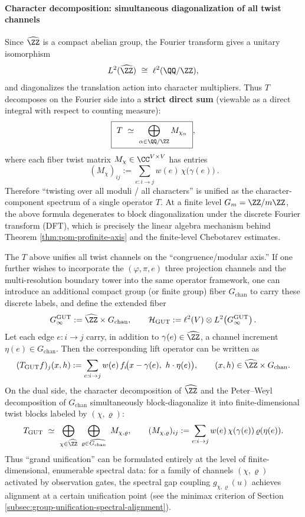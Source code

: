 \paragraph{Character decomposition: simultaneous diagonalization of all twist channels}
Since \(\widehat{\ZZ}\) is a compact abelian group, the Fourier transform gives a unitary isomorphism
\[
L^2(\widehat{\ZZ})\ \cong\ \ell^2(\QQ/\ZZ),
\]
and diagonalizes the translation action into character multipliers. Thus \(T\) decomposes on the Fourier side into a \textbf{strict direct sum} (viewable as a direct integral with respect to counting measure):
\[
\boxed{\ T\ \simeq\ \bigoplus_{\alpha\in\QQ/\ZZ} M_{\chi_\alpha}\ },
\]
where each fiber twist matrix \(M_{\chi}\in\CC^{V\times V}\) has entries
\[
\boxed{\ (M_\chi)_{ij}:=\sum_{e:i\to j} w(e)\,\chi\!\bigl(\gamma(e)\bigr)\ }.
\]
Therefore ``twisting over all moduli / all characters'' is unified as the character-component spectrum of a single operator \(T\).
At a finite level \(G_m=\ZZ/m\ZZ\), the above formula degenerates to block diagonalization under the discrete Fourier transform (DFT), which is precisely the linear algebra mechanism behind Theorem \ref{thm:pom-profinite-axis} and the finite-level Chebotarev estimates.

\begin{remark}\label{rem:pom-grand-unified-lift}
The \(T\) above unifies all twist channels on the ``congruence/modular axis.''
If one further wishes to incorporate the \((\varphi,\pi,e)\) three projection channels and the multi-resolution boundary tower into the same operator framework,
one can introduce an additional compact group (or finite group) fiber \(G_{\mathrm{chan}}\) to carry these discrete labels, and define the extended fiber
\[
G_\infty^{\mathrm{GUT}}
:=\widehat{\ZZ}\times G_{\mathrm{chan}},
\qquad
\mathcal{H}_{\mathrm{GUT}}:=\ell^2(V)\otimes L^2\!\left(G_\infty^{\mathrm{GUT}}\right).
\]
Let each edge \(e:i\to j\) carry, in addition to \(\gamma(e)\in\widehat{\ZZ}\), a channel increment \(\eta(e)\in G_{\mathrm{chan}}\).
Then the corresponding lift operator can be written as
\[
(T_{\mathrm{GUT}}f)_j(x,h)
:=\sum_{e:i\to j} w(e)\,f_i\!\bigl(x-\gamma(e),\ h\cdot \eta(e)\bigr),
\qquad (x,h)\in \widehat{\ZZ}\times G_{\mathrm{chan}}.
\]
On the dual side, the character decomposition of \(\widehat{\ZZ}\) and the Peter--Weyl decomposition of \(G_{\mathrm{chan}}\) simultaneously block-diagonalize it into finite-dimensional twist blocks labeled by \((\chi,\varrho)\):
\[
T_{\mathrm{GUT}}\ \simeq\ \bigoplus_{\chi\in\widehat{\ZZ}}\ \bigoplus_{\varrho\in\widehat{G_{\mathrm{chan}}}}\ M_{\chi,\varrho},
\qquad
(M_{\chi,\varrho})_{ij}:=\sum_{e:i\to j} w(e)\,\chi(\gamma(e))\,\varrho(\eta(e)).
\]
Thus ``grand unification'' can be formulated entirely at the level of finite-dimensional, enumerable spectral data: for a family of channels \((\chi,\varrho)\) activated by observation gates, the spectral gap coupling \(g_{\chi,\varrho}(u)\) achieves alignment at a certain unification point (see the minimax criterion of Section \ref{subsec:group-unification-spectral-alignment}).
\end{remark}

